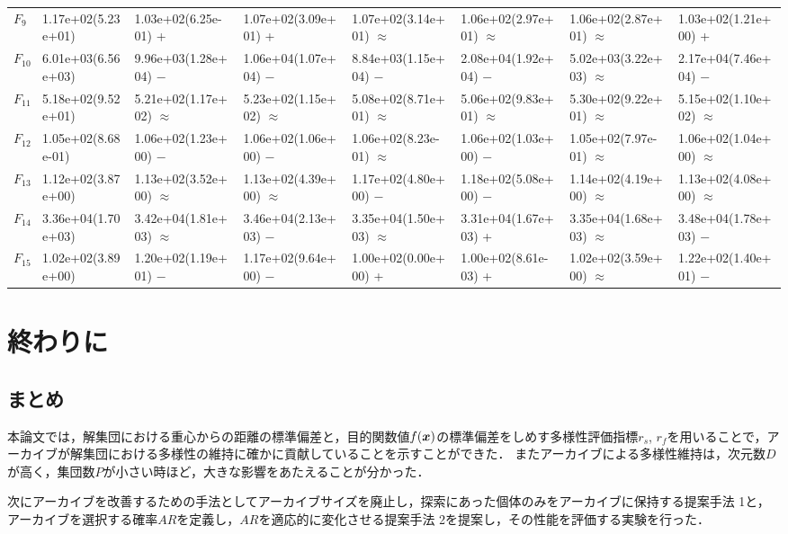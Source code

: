\documentclass[a4paper,11pt,oneside,openany]{jsbook}
\def\vector#1{\mbox{\boldmath $#1$}}
\begin{document}
\begin{landscape}
\begin{table}[!tbp]
\begin{center}
\begin{tabular}{llllllll}
$F_{9}$&1.17e+02(5.23e+01)&1.03e+02(6.25e-01) +&1.07e+02(3.09e+01) +&1.07e+02(3.14e+01) $\approx$&1.06e+02(2.97e+01) $\approx$&1.06e+02(2.87e+01) $\approx$&1.03e+02(1.21e+00) +\tabularnewline
$F_{10}$&6.01e+03(6.56e+03)&9.96e+03(1.28e+04) −&1.06e+04(1.07e+04) −&8.84e+03(1.15e+04) −&2.08e+04(1.92e+04) −&5.02e+03(3.22e+03) $\approx$&2.17e+04(7.46e+04) −\tabularnewline
$F_{11}$&5.18e+02(9.52e+01)&5.21e+02(1.17e+02) $\approx$&5.23e+02(1.15e+02) $\approx$&5.08e+02(8.71e+01) $\approx$&5.06e+02(9.83e+01) $\approx$&5.30e+02(9.22e+01) $\approx$&5.15e+02(1.10e+02) $\approx$\tabularnewline
$F_{12}$&1.05e+02(8.68e-01)&1.06e+02(1.23e+00) −&1.06e+02(1.06e+00) −&1.06e+02(8.23e-01) $\approx$&1.06e+02(1.03e+00) −&1.05e+02(7.97e-01) $\approx$&1.06e+02(1.04e+00) $\approx$\tabularnewline
$F_{13}$&1.12e+02(3.87e+00)&1.13e+02(3.52e+00) $\approx$&1.13e+02(4.39e+00) $\approx$&1.17e+02(4.80e+00) −&1.18e+02(5.08e+00) −&1.14e+02(4.19e+00) $\approx$&1.13e+02(4.08e+00) $\approx$\tabularnewline
$F_{14}$&3.36e+04(1.70e+03)&3.42e+04(1.81e+03) $\approx$&3.46e+04(2.13e+03) −&3.35e+04(1.50e+03) $\approx$&3.31e+04(1.67e+03) +&3.35e+04(1.68e+03) $\approx$&3.48e+04(1.78e+03) −\tabularnewline
$F_{15}$&1.02e+02(3.89e+00)&1.20e+02(1.19e+01) −&1.17e+02(9.64e+00) −&1.00e+02(0.00e+00) +&1.00e+02(8.61e-03) +&1.02e+02(3.59e+00) $\approx$&1.22e+02(1.40e+01) −\tabularnewline
\hline
\end{tabular}\end{center}

\end{table}
\end{landscape}
\newpage

\chapter{終わりに}
\section{まとめ}
本論文では，解集団における重心からの距離の標準偏差と，目的関数値$f(\vector{x})$の標準偏差をしめす多様性評価指標$r_s$, $r_f$を用いることで，アーカイブが解集団における多様性の維持に確かに貢献していることを示すことができた．
またアーカイブによる多様性維持は，次元数$D$が高く，集団数$P$が小さい時ほど，大きな影響をあたえることが分かった．

次にアーカイブを改善するための手法としてアーカイブサイズを廃止し，探索にあった個体のみをアーカイブに保持する提案手法 1と，アーカイブを選択する確率$AR$を定義し，$AR$を適応的に変化させる提案手法 2を提案し，その性能を評価する実験を行った．
\end{document}
